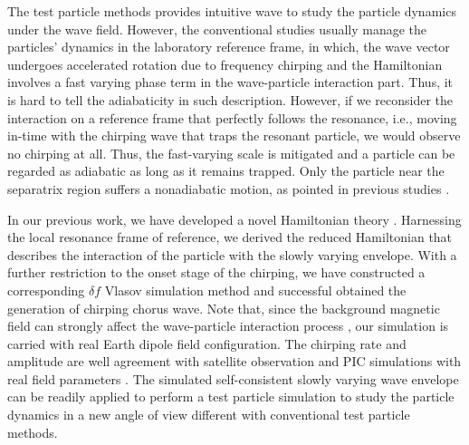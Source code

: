 The test particle methods \cite{huanghua_test_ptc,omura_test_ptc,tao_test_ptc} provides intuitive wave to study the particle dynamics under the wave field.
However, the conventional studies usually manage the particles' dynamics in the laboratory reference frame,
in which, the wave vector undergoes accelerated rotation due to frequency chirping and the Hamiltonian involves a fast varying phase term in the wave-particle interaction part. 
Thus, it is hard to tell the adiabaticity in such description.
However, if we reconsider the interaction on a reference frame that perfectly follows the resonance, i.e., moving in-time with the chirping wave that traps the resonant particle, we would observe no chirping at all. Thus, the fast-varying scale is mitigated and a particle can be regarded as adiabatic as long as it remains trapped. Only the particle near the separatrix region suffers a nonadiabatic motion, as pointed in previous studies \cite{CARY1989287}.

In our previous work, we have developed a novel Hamiltonian theory \cite{zheng2024}. 
Harnessing the local resonance frame of reference, we derived the reduced Hamiltonian that describes the interaction of the particle with the slowly varying envelope.
With a further restriction to the onset stage of the chirping, we have constructed a corresponding $\delta f$ Vlasov simulation method and successful obtained the generation of chirping chorus wave.
Note that, since the background magnetic field can strongly affect the wave-particle interaction process \cite{wu2023,wu_controlling_2020}, our simulation is carried with real Earth dipole field configuration.
The chirping rate and amplitude are well agreement with satellite observation \cite{cully_observational_2011} and PIC simulations with real field parameters \cite{katoh2016}.
The simulated self-consistent slowly varying wave envelope can be readily applied to perform a test particle simulation to study the particle dynamics in a new angle of view different with conventional test particle methods. 


